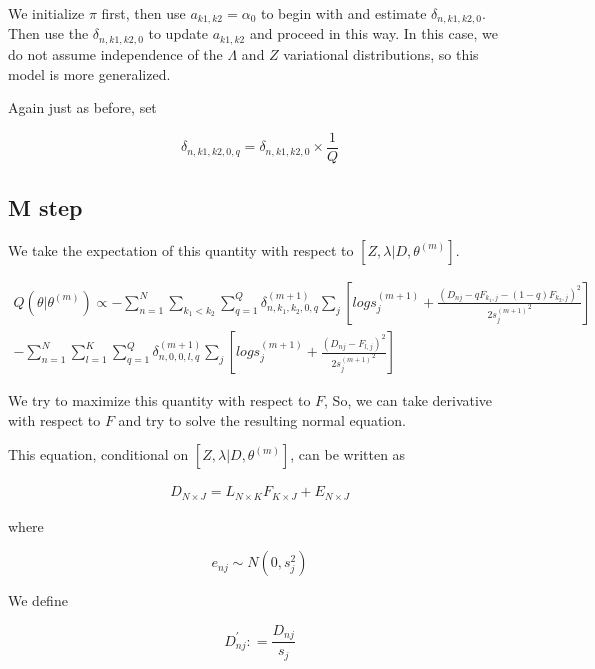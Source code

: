 \documentclass[12pt]{article}
\begin{document}
We initialize $\pi$  first, then use $a_{k1,k2}=\alpha_0$  to begin with and estimate $\delta_{n,k1,k2,0}$. Then use the $\delta_{n,k1,k2,0}$ to update $a_{k1,k2}$  and proceed in this way. In this case, we do not assume independence of the $\Lambda$ and $Z$ variational distributions, so this model is more generalized.

Again just as before, set 

$$ \delta_{n,k1,k2,0, q} = \delta_{n,k1,k2,0} \times \frac{1}{Q}  $$



\subsection{M step}


%
%
%
%
We take the expectation of this quantity with respect to $\left [ Z, \lambda | D, \theta^{(m)} \right ]$.

\begin{eqnarray}
 Q (\theta | \theta^{(m)}) \propto - \sum_{n=1}^{N} \sum_{k_1 < k_2} \sum_{q=1}^{Q} \delta^{(m+1)}_{n, k_1, k_2, 0, q}  \sum_{j} \left [ log s^{(m+1)}_{j} + \frac{(D_{nj} - q F_{k_1,j} - (1-q) F_{k_2,j})^2}{2{s_j^{(m+1)}}^2} \right] \\
 -   \sum_{n=1}^{N} \sum_{l=1}^{K} \sum_{q=1}^{Q} \delta^{(m+1)}_{n, 0, 0, l, q}  \sum_{j} \left [ log s^{(m+1)}_{j} + \frac{(D_{nj} - F_{l,j})^2}{2{s_j^{(m+1)}}^2} \right] 
\end{eqnarray}

We try to maximize this quantity with respect to $F$, So, we can take derivative with respect to $F$ and try to solve the resulting normal equation.

This equation, conditional on $\left [ Z, \lambda | D, \theta^{(m)} \right ]$, can be written as 

\begin{eqnarray}
 D_{N \times J} = L_{N \times K} F_{K \times J} + E_{N \times J}
\end{eqnarray}

where 

$$ e_{nj} \sim N(0, s^2_{j}) $$

We define 

$$ D^{'}_{nj} : = \frac{D_{nj}}{s_{j}} $$
\end{document}
